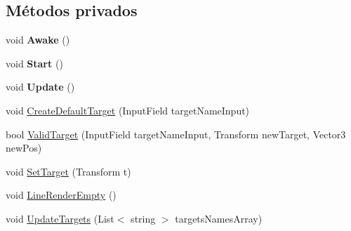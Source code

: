 \subsection*{Métodos privados}
\begin{DoxyCompactItemize}
\item 
\mbox{\label{class_game_controller_a1dfa0b843c71b7013f101e200613e8b5}} 
void {\bfseries Awake} ()
\item 
\mbox{\label{class_game_controller_a97788a7aa0f09c8d748781683e5f045b}} 
void {\bfseries Start} ()
\item 
\mbox{\label{class_game_controller_a5a89277529cadb49af7d55eba3bbf056}} 
void {\bfseries Update} ()
\item 
void \mbox{\hyperlink{class_game_controller_afb7da85e39dbf57ae9a540e9dcff034a}{Create\+Default\+Target}} (Input\+Field target\+Name\+Input)
\item 
bool \mbox{\hyperlink{class_game_controller_a6f2e4f2c0b6a0e96d96087ad65c5b57c}{Valid\+Target}} (Input\+Field target\+Name\+Input, Transform new\+Target, Vector3 new\+Pos)
\item 
void \mbox{\hyperlink{class_game_controller_af33ac3595c0cdcd615cf63738638482f}{Set\+Target}} (Transform t)
\item 
void \mbox{\hyperlink{class_game_controller_a4156d664c9b3dce275af61bff2c00a69}{Line\+Render\+Empty}} ()
\item 
void \mbox{\hyperlink{class_game_controller_a0faec72a151b40bb1a13340f89a735aa}{Update\+Targets}} (List$<$ string $>$ targets\+Names\+Array)
\end{DoxyCompactItemize}
